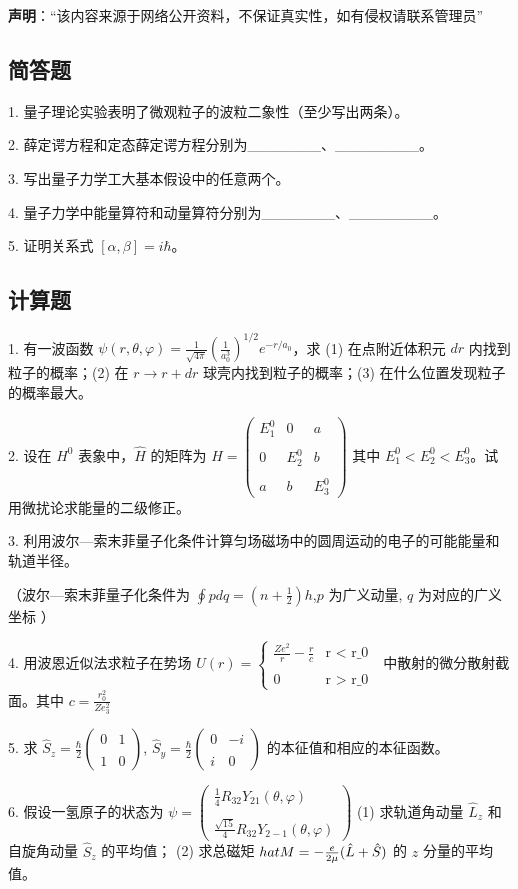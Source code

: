 
\textbf{声明}：“该内容来源于网络公开资料，不保证真实性，如有侵权请联系管理员”

\subsection{简答题}

1. 量子理论实验表明了微观粒子的波粒二象性（至少写出两条）。

2. 薛定谔方程和定态薛定谔方程分别为_______、________。

3. 写出量子力学工大基本假设中的任意两个。

4. 量子力学中能量算符和动量算符分别为_______、________。

5. 证明关系式 $[\alpha, \beta] = i \hbar$。

\subsection{计算题}

1. 有一波函数 $\psi(r, \theta, \varphi) = \frac{1}{\sqrt{4 \pi}} \left( \frac{1}{a_0^3} \right)^{1/2} e^{-r/a_0}$，求 (1) 在点附近体积元 $dr$ 内找到粒子的概率；(2) 在 $r \to r + dr$ 球壳内找到粒子的概率；(3) 在什么位置发现粒子的概率最大。

2. 设在 $H^0$ 表象中，$\hat{H}$ 的矩阵为
$\hat{H} = \begin{pmatrix}E_1^0 & 0 & a \\\\0 & E_2^0 & b \\\\a & b & E_3^0\end{pmatrix}$
其中 $E_1^0 < E_2^0 < E_3^0$。试用微扰论求能量的二级修正。

3. 利用波尔—索末菲量子化条件计算匀场磁场中的圆周运动的电子的可能能量和轨道半径。

（波尔—索末菲量子化条件为 $\oint p dq = (n + \frac{1}{2}) h$,$p$ 为广义动量, $q$ 为对应的广义坐标 ）

4. 用波恩近似法求粒子在势场 $U(r) = \begin{cases} 
\frac{Ze^2}{r} - \frac{r}{c} & \text {r < r_0 }\\\\
0 & \text{r > r_0 }
\end{cases}$ 中散射的微分散射截面。其中
$c = \frac{r_0^2}{Ze_3^2}$

5. 求 $\hat{S}_z = \frac{\hbar}{2} \begin{pmatrix}
0 & 1 \\\\
1 & 0
\end{pmatrix}$, $\hat{S}_y = \frac{\hbar}{2} \begin{pmatrix}
0 & -i \\\\
i & 0
\end{pmatrix}$ 的本征值和相应的本征函数。

6. 假设一氢原子的状态为
$\psi = \begin{pmatrix}\frac{1}{4} R_{32}  Y_{21}(\theta, \varphi) \\\\\frac{\sqrt{15}}{4} R_{32}  Y_{2-1}(\theta, \varphi)\end{pmatrix}$
(1) 求轨道角动量 $\hat{L}_z$ 和自旋角动量 $\hat{S}_z$ 的平均值；
(2) 求总磁矩 $\\hat{M} = -\frac{e}{2\mu} (\hat{L} + \hat{S})$ 的 $z$ 分量的平均值。
